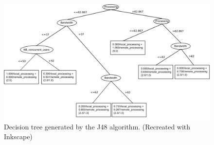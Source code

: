 \begin{figure}[H]
	\centering
	\includegraphics[width=1\textwidth]{../images/decision_tree.png}
	\caption{Decision tree generated by the J48 algorithm. (Recreated with Inkscape)}
	\label{fig:decision-tree}
\end{figure}

